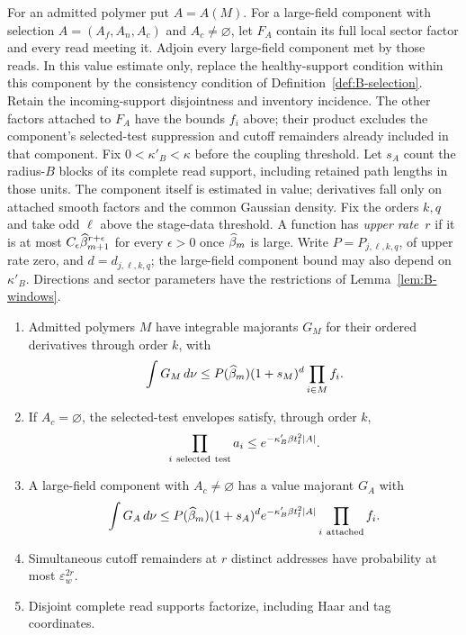 For an admitted polymer put $A=A(M)$. For a large-field component with selection $A=(A_f,A_n,A_c)$ and $A_c\ne\varnothing$, let $F_A$ contain its full local sector factor and every read meeting it. Adjoin every large-field component met by those reads. In this value estimate only, replace the healthy-support condition within this component by the consistency condition of Definition~\ref{def:B-selection}. Retain the incoming-support disjointness and inventory incidence. The other factors attached to $F_A$ have the bounds $f_i$ above; their product excludes the component's selected-test suppression and cutoff remainders already included in that component. Fix $0<\kappa'_B<\kappa$ before the coupling threshold. Let $s_A$ count the radius-$B$ blocks of its complete read support, including retained path lengths in those units. The component itself is estimated in value; derivatives fall only on attached smooth factors and the common Gaussian density. Fix the orders $k,q$ and take odd $\ell$ above the stage-data threshold. A function has \emph{upper rate}~$r$ if it is at most $C_\epsilon\widehat{\beta}_{m+1}^{r+\epsilon}$ for every $\epsilon>0$ once $\widehat{\beta}_m$ is large. Write $P=P_{j,\ell,k,q}$, of upper rate zero, and $d=d_{j,\ell,k,q}$; the large-field component bound may also depend on $\kappa'_B$. Directions and sector parameters have the restrictions of Lemma~\ref{lem:B-windows}.
\begin{lemma}\label{lem:B-D2}
\begin{enumerate}[label=(\roman*)]
\item Admitted polymers $M$ have integrable majorants $G_M$ for their ordered derivatives through order $k$, with
\begin{equation*}
\int G_M\,d\nu\le P(\widehat{\beta}_m)(1+s_M)^d\prod_{i\in M}f_i.
\end{equation*}
\item If $A_c=\varnothing$, the selected-test envelopes satisfy, through order $k$,
\begin{equation*}
\prod_{i\ {\rm selected\ test}}a_i\le e^{-\kappa'_B\beta t_{\rm f}^2|A|}.
\end{equation*}
\item A large-field component with $A_c\ne\varnothing$ has a value majorant $G_A$ with
\begin{equation*}
\int G_A\,d\nu\le P(\widehat{\beta}_m)(1+s_A)^d e^{-\kappa'_B\beta t_{\rm f}^2|A|}\prod_{i\ {\rm attached}}f_i.
\end{equation*}
\item Simultaneous cutoff remainders at $r$ distinct addresses have probability at most $\varepsilon_w^{2r}$.
\item Disjoint complete read supports factorize, including Haar and tag coordinates.
\end{enumerate}
\end{lemma}
